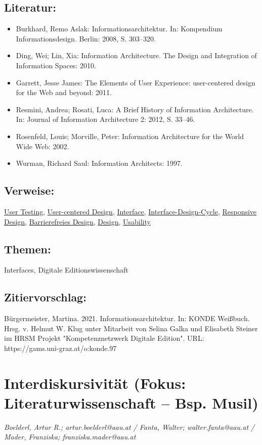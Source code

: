 \documentclass{article}
\begin{document}
        \subsection*{Literatur:}\begin{itemize}\item Burkhard, Remo Aslak: Informationsarchitektur. In: Kompendium Informationsdesign. Berlin: 2008, S. 303–320.\item Ding, Wei; Lin, Xia: Information Architecture. The Design and Integration of
                              Information Spaces: 2010.\item Garrett, Jesse James: The Elements of User Experience: user-centered design
                              for the Web and beyond: 2011.\item Resmini, Andrea; Rosati, Luca: A Brief History of Information Architecture. In: Journal of Information Architecture 2: 2012, S. 33–46.\item Rosenfeld, Louis; Morville, Peter: Information Architecture for the World Wide Web: 2002.\item Wurman, Richard Saul: Information Architects: 1997.\end{itemize}\subsection*{Verweise:}\href{https://gams.uni-graz.at/o:konde.206}{User Testing}, \href{https://gams.uni-graz.at/o:konde.207}{User-centered Design}, \href{https://gams.uni-graz.at/o:konde.98}{Interface}, \href{https://gams.uni-graz.at/o:konde.99}{Interface-Design-Cycle}, \href{https://gams.uni-graz.at/o:konde.164}{Responsive Design}, \href{https://gams.uni-graz.at/o:konde.35}{Barrierefreies Design}, \href{https://gams.uni-graz.at/o:konde.56}{Design}, \href{https://gams.uni-graz.at/o:konde.205}{Usability}\subsection*{Themen:}Interfaces, Digitale Editionswissenschaft\subsection*{Zitiervorschlag:}Bürgermeister, Martina. 2021. Informationsarchitektur. In: KONDE Weißbuch. Hrsg. v. Helmut W. Klug unter Mitarbeit von Selina Galka und Elisabeth Steiner im HRSM Projekt "Kompetenznetzwerk Digitale Edition". URL: https://gams.uni-graz.at/o:konde.97\newpage\section*{Interdiskursivität (Fokus: Literaturwissenschaft – Bsp. Musil)} \emph{Boelderl, Artur R.; artur.boelderl@aau.at / Fanta, Walter; walter.fanta@aau.at
                  / Mader, Franziska; franziska.mader@aau.at}\\
        
\end{document}
